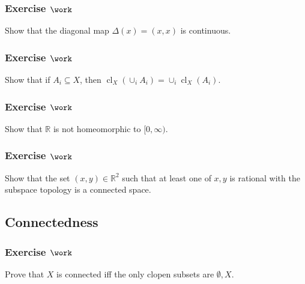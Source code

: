 \hypertarget{exercise-work-1}{%
\subsubsection{\texorpdfstring{Exercise
\(\work\)}{Exercise \textbackslash work}}\label{exercise-work-1}}

Show that the diagonal map \(\Delta(x) = (x, x)\) is continuous.

\hypertarget{exercise-work-2}{%
\subsubsection{\texorpdfstring{Exercise
\(\work\)}{Exercise \textbackslash work}}\label{exercise-work-2}}

Show that if \(A_i \subseteq X\), then
\(\operatorname{cl}_X(\cup_i A_i) = \cup_i \operatorname{cl}_X(A_i)\).

\hypertarget{exercise-work-3}{%
\subsubsection{\texorpdfstring{Exercise
\(\work\)}{Exercise \textbackslash work}}\label{exercise-work-3}}

Show that \({\mathbb{R}}\) is not homeomorphic to \([0, \infty)\).

\hypertarget{exercise-work-4}{%
\subsubsection{\texorpdfstring{Exercise
\(\work\)}{Exercise \textbackslash work}}\label{exercise-work-4}}

Show that the set \((x, y) \in {\mathbb{R}}^2\) such that at least one
of \(x, y\) is rational with the subspace topology is a connected space.

\hypertarget{connectedness-1}{%
\subsection{Connectedness}\label{connectedness-1}}

\hypertarget{exercise-work-5}{%
\subsubsection{\texorpdfstring{Exercise
\(\work\)}{Exercise \textbackslash work}}\label{exercise-work-5}}

Prove that \(X\) is connected iff the only clopen subsets are
\(\emptyset, X\).

